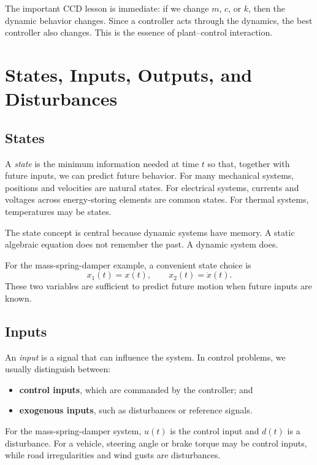 \documentclass[11pt]{article}
\begin{document}
The important CCD lesson is immediate: if we change $m$, $c$, or $k$, then the dynamic behavior changes. Since a controller acts through the dynamics, the best controller also changes. This is the essence of plant--control interaction.

\section{States, Inputs, Outputs, and Disturbances}

\subsection{States}

A \emph{state} is the minimum information needed at time $t$ so that, together with future inputs, we can predict future behavior. For many mechanical systems, positions and velocities are natural states. For electrical systems, currents and voltages across energy-storing elements are common states. For thermal systems, temperatures may be states.

The state concept is central because dynamic systems have memory. A static algebraic equation does not remember the past. A dynamic system does.

For the mass-spring-damper example, a convenient state choice is
\begin{equation}
 x_1(t)=x(t), \qquad x_2(t)=\dot{x}(t).
\end{equation}
These two variables are sufficient to predict future motion when future inputs are known.

\subsection{Inputs}

An \emph{input} is a signal that can influence the system. In control problems, we usually distinguish between:
\begin{itemize}[leftmargin=1.4em]
  \item \textbf{control inputs}, which are commanded by the controller; and
  \item \textbf{exogenous inputs}, such as disturbances or reference signals.
\end{itemize}

For the mass-spring-damper system, $u(t)$ is the control input and $d(t)$ is a disturbance. For a vehicle, steering angle or brake torque may be control inputs, while road irregularities and wind gusts are disturbances.
\end{document}
